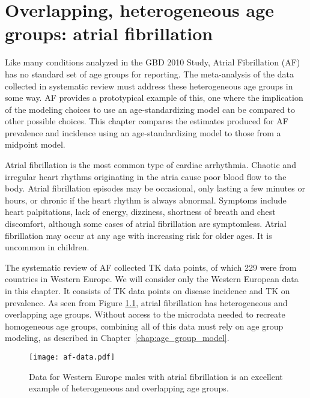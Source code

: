 \chapter{Overlapping, heterogeneous age groups: atrial fibrillation}
\label{applications-age_groups}

Like many conditions analyzed in the GBD 2010 Study, Atrial
Fibrillation (AF) has no standard set of age groups for reporting.  The
meta-analysis of the data collected in systematic review must address
these heterogeneous age groups in some way. AF provides a prototypical
example of this, one where the implication of the modeling choices to
use an age-standardizing model can be compared to other possible
choices.  This chapter compares the estimates produced for AF
prevalence and incidence using an age-standardizing model to those
from a midpoint model.

Atrial fibrillation is the most common type of cardiac arrhythmia.
Chaotic and irregular heart rhythms originating in the atria cause
poor blood flow to the body.  Atrial fibrillation episodes may be
occasional, only lasting a few minutes or hours, or chronic if the
heart rhythm is always abnormal.  Symptoms include heart palpitations,
lack of energy, dizziness, shortness of breath and chest discomfort,
although some cases of atrial fibrillation are symptomless.  Atrial
fibrillation may occur at any age with increasing risk for older ages.
It is uncommon in children. \cite{rich_epidemiology_2009,
  rho_asymptomatic_2005, fuster_acc/aha/esc_2006, radford_atrial_1977}

The systematic review of AF collected TK data points, of which 229
were from countries in Western Europe.  We will consider only the
Western European data in this chapter. It consists of TK data points
on disease incidence and TK on prevalence.  As seen from Figure
\ref{fig:app-af data}, atrial fibrillation has heterogeneous and
overlapping age groups.  Without access to the microdata needed to
recreate homogeneous age groups, combining all of this data must rely
on age group modeling, as described in
Chapter~\ref{chap:age_group_model}.

    \begin{figure}[h]
        \begin{center}
            \texttt{[image: af-data.pdf]}
            \caption{Data for Western Europe males with atrial
              fibrillation is an excellent example of heterogeneous
              and overlapping age groups.}
            \label{fig:app-af data}
        \end{center}
    \end{figure}

